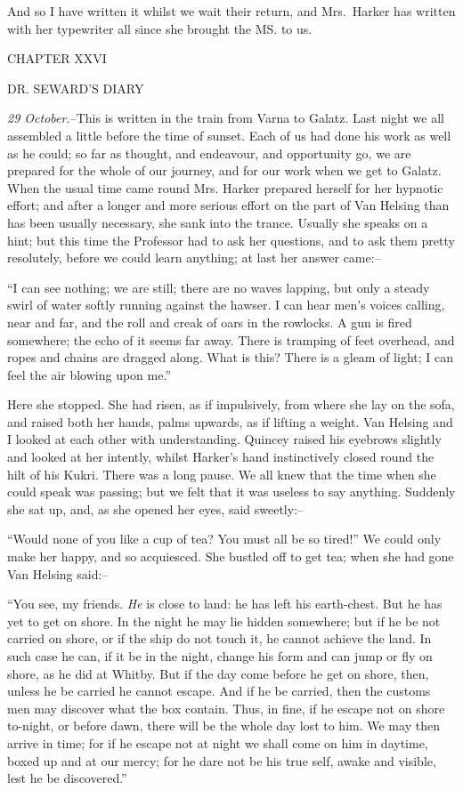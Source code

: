 \documentclass[12pt,openright]{book}
\begin{document}
And so I have written it whilst we wait their return, and Mrs. Harker has written with her typewriter all since she brought the MS. to us.

CHAPTER XXVI

DR. SEWARD’S DIARY

\textit{29 October.}–This is written in the train from Varna to Galatz. Last night we all assembled a little before the time of sunset. Each of us had done his work as well as he could; so far as thought, and endeavour, and opportunity go, we are prepared for the whole of our journey, and for our work when we get to Galatz. When the usual time came round Mrs. Harker prepared herself for her hypnotic effort; and after a longer and more serious effort on the part of Van Helsing than has been usually necessary, she sank into the trance. Usually she speaks on a hint; but this time the Professor had to ask her questions, and to ask them pretty resolutely, before we could learn anything; at last her answer came:–

“I can see nothing; we are still; there are no waves lapping, but only a steady swirl of water softly running against the hawser. I can hear men’s voices calling, near and far, and the roll and creak of oars in the rowlocks. A gun is fired somewhere; the echo of it seems far away. There is tramping of feet overhead, and ropes and chains are dragged along. What is this? There is a gleam of light; I can feel the air blowing upon me.”

Here she stopped. She had risen, as if impulsively, from where she lay on the sofa, and raised both her hands, palms upwards, as if lifting a weight. Van Helsing and I looked at each other with understanding. Quincey raised his eyebrows slightly and looked at her intently, whilst Harker’s hand instinctively closed round the hilt of his Kukri. There was a long pause. We all knew that the time when she could speak was passing; but we felt that it was useless to say anything. Suddenly she sat up, and, as she opened her eyes, said sweetly:–

“Would none of you like a cup of tea? You must all be so tired!” We could only make her happy, and so acquiesced. She bustled off to get tea; when she had gone Van Helsing said:–

“You see, my friends. \textit{He} is close to land: he has left his earth-chest. But he has yet to get on shore. In the night he may lie hidden somewhere; but if he be not carried on shore, or if the ship do not touch it, he cannot achieve the land. In such case he can, if it be in the night, change his form and can jump or fly on shore, as he did at Whitby. But if the day come before he get on shore, then, unless he be carried he cannot escape. And if he be carried, then the customs men may discover what the box contain. Thus, in fine, if he escape not on shore to-night, or before dawn, there will be the whole day lost to him. We may then arrive in time; for if he escape not at night we shall come on him in daytime, boxed up and at our mercy; for he dare not be his true self, awake and visible, lest he be discovered.”
\end{document}
